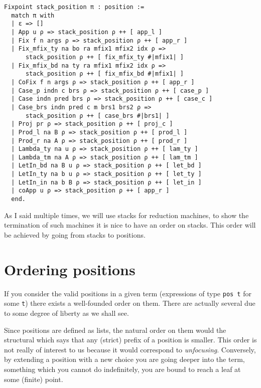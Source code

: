 \begin{verbatim}
Fixpoint stack_position π : position :=
  match π with
  | ε => []
  | App u ρ => stack_position ρ ++ [ app_l ]
  | Fix f n args ρ => stack_position ρ ++ [ app_r ]
  | Fix_mfix_ty na bo ra mfix1 mfix2 idx ρ =>
      stack_position ρ ++ [ fix_mfix_ty #|mfix1| ]
  | Fix_mfix_bd na ty ra mfix1 mfix2 idx ρ =>
      stack_position ρ ++ [ fix_mfix_bd #|mfix1| ]
  | CoFix f n args ρ => stack_position ρ ++ [ app_r ]
  | Case_p indn c brs ρ => stack_position ρ ++ [ case_p ]
  | Case indn pred brs ρ => stack_position ρ ++ [ case_c ]
  | Case_brs indn pred c m brs1 brs2 ρ =>
      stack_position ρ ++ [ case_brs #|brs1| ]
  | Proj pr ρ => stack_position ρ ++ [ proj_c ]
  | Prod_l na B ρ => stack_position ρ ++ [ prod_l ]
  | Prod_r na A ρ => stack_position ρ ++ [ prod_r ]
  | Lambda_ty na u ρ => stack_position ρ ++ [ lam_ty ]
  | Lambda_tm na A ρ => stack_position ρ ++ [ lam_tm ]
  | LetIn_bd na B u ρ => stack_position ρ ++ [ let_bd ]
  | LetIn_ty na b u ρ => stack_position ρ ++ [ let_ty ]
  | LetIn_in na b B ρ => stack_position ρ ++ [ let_in ]
  | coApp u ρ => stack_position ρ ++ [ app_r ]
  end.
\end{verbatim}

As I said multiple times, we will use stacks for reduction machines, to show the
termination of such machines it is nice to have an order on stacks. This order
will be achieved by going from stacks to positions.

\section{Ordering positions}

If you consider the valid positions in a given term (\ie expressions of type
\texttt{pos t} for some \texttt{t}) there exists a
well-founded order on them. There are actually several due to some degree of
liberty as we shall see.

Since positions are defined as lists, the natural order on them would the
structural which says that any (strict) prefix of a position is smaller.
This order is not really of interest to us because it would correspond to
\emph{unfocusing}.
Conversely, by extending a position with a new choice you are going deeper into
the term, something which you cannot do indefinitely, you are bound to reach a
leaf at some (finite) point.

